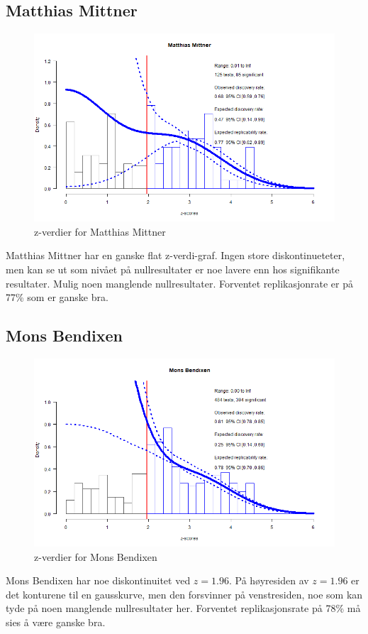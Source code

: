 \documentclass[doc,norsk]{apa7}
\begin{document}
\subsection{Matthias Mittner}
\begin{figure}[h!]
    \centering
    \includegraphics[width=\textwidth]{images/Matthias Mittner.png}
    \caption{z-verdier for Matthias Mittner}
\end{figure}
Matthias Mittner har en ganske flat z-verdi-graf. Ingen store diskontinueteter, men kan se ut som nivået på nullresultater er noe lavere enn hos signifikante resultater. Mulig noen manglende nullresultater. Forventet replikasjonrate er på 77\% som er ganske bra.

\subsection{Mons Bendixen}
\begin{figure}[h!]
    \centering
    \includegraphics[width=\textwidth]{images/Mons Bendixen.png}
    \caption{z-verdier for Mons Bendixen}
\end{figure}
Mons Bendixen har noe diskontinuitet ved $z=1.96$. På høyresiden av $z=1.96$ er det konturene til en gausskurve, men den forsvinner på venstresiden, noe som kan tyde på noen manglende nullresultater her. Forventet replikasjonsrate på 78\% må sies å være ganske bra.
\end{document}
